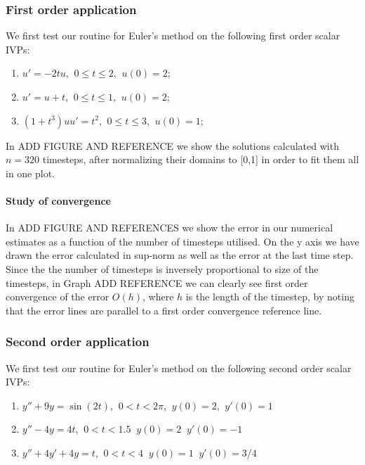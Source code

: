 \documentclass[a4paper,11]{article}
\begin{document}
\subsubsection{First order application}\label{sssection:feuler_1_order}

We first test our routine for Euler's method on the following first order 
scalar IVPs:

\begin{enumerate}
	\item {$u' = -2t u$, $\ 0 \le t \le 2$, $\ u(0) = 2$; %
		}
	\item{$u' = u + t$, $\ 0 \le t \le 1$, $\ u(0) = 2$; %
	}
	\item{$(1+t^3)uu' = t^2$, $\ 0 \le t \le 3$, $\ u(0) =1$;%
	}
\end{enumerate}

In ADD FIGURE AND REFERENCE we show the solutions calculated with $n=320$
timesteps, after 
normalizing their domains to [0,1] in order to fit them all in one plot.

\paragraph{Study of convergence}

In ADD FIGURE AND REFERENCES we show the error in our numerical estimates as a 
function of the number of timesteps utilised. On the y axis we have drawn
the error calculated in sup-norm as well as the error at the last time step.
Since the the number of timesteps is inversely proportional to size of the 
timesteps, in Graph ADD REFERENCE we can clearly see first order convergence  
of the error $O(h)$, where $h$ is the length of the timestep, 
by noting that the error lines are parallel to a first order convergence 
reference line.

\subsubsection{Second order application}

We first test our routine for Euler's method on the following second order 
scalar IVPs:

\begin{enumerate}
	\item {$y''+ 9y = \sin(2t)$, $\ 0< t< 2\pi$, $\ y(0) = 2$, $\ y'(0) = 1$}
	\item{$y''- 4y = 4t$, $\: 0< t< 1.5$ $\: y(0) = 2$ $\: y'(0) = -1$ %
	}
	\item{$y''+ 4y'+ 4y = t$, $\: 0< t< 4$  $\: y(0) = 1$ $\: y'(0) = 3/4$ %
	}
\end{enumerate}
\end{document}
